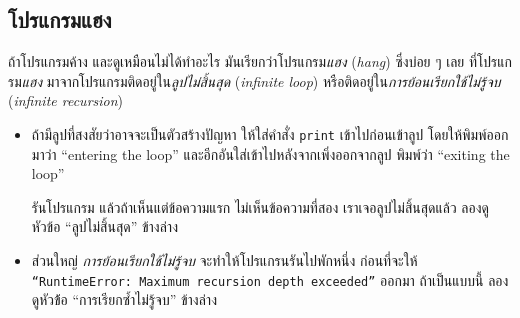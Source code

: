 \subsection{โปรแกรมแฮง}



ถ้าโปรแกรมค้าง และดูเหมือนไม่ได้ทำอะไร
มันเรียกว่าโปรแกรม\textit{แฮง} (\textit{hang})
ซึ่งบ่อย ๆ เลย ที่โปรแกรม\textit{แฮง} มาจากโปรแกรมติดอยู่ใน\textit{ลูปไม่สิ้นสุด} (\textit{infinite loop}) หรือติดอยู่ใน\textit{การย้อนเรียกใช้ไม่รู้จบ} (\textit{infinite recursion})

\begin{itemize}



\item ถ้ามีลูปที่สงสัยว่าอาจจะเป็นตัวสร้างปัญหา
ให้ใส่คำสั่ง \texttt{print} เข้าไปก่อนเข้าลูป โดยให้พิมพ์ออกมาว่า ``entering the loop'' และอีกอันใส่เข้าไปหลังจากเพิ่งออกจากลูป พิมพ์ว่า ``exiting the loop''

%
รันโปรแกรม แล้วถ้าเห็นแต่ข้อความแรก ไม่เห็นข้อความที่สอง เราเจอลูปไม่สิ้นสุดแล้ว ลองดูหัวข้อ ``ลูปไม่สิ้นสุด'' ข้างล่าง


\item ส่วนใหญ่ \textit{การย้อนเรียกใช้ไม่รู้จบ} จะทำให้โปรแกรนรันไปพักหนึ่ง
ก่อนที่จะให้
\texttt{``RuntimeError: Maximum
recursion depth exceeded''} ออกมา
ถ้าเป็นแบบนี้ ลองดูหัวข้้อ ``การเรียกซ้ำไม่รู้จบ'' ข้างล่าง



\end{itemize}
